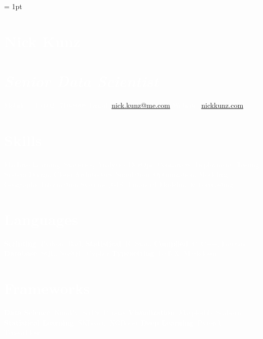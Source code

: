 \documentclass{article}
\author{Nick Kunz}
\begin{document}
\noindent
\scriptsize
{}\font = 1pt
    \begin{bgbox}[
        height = \paperheight,
        width = 0.3\textwidth,
        colback = gray
    ]
        \textcolor{white}{
            \section*{Nick Kunz}
            \section*{\textit{\normalsize{Senior Data Scientist}}}
                Mobile: \space\space\space\space\space\space+1 $($602$)$ 710-8608\newline
                Email: \space\space\space\space\space\space\space\space\space\url{nick.kunz@me.com}\newline
                Website: \space\space\space\space\space\url{nickkunz.com}
            \section*{Skills}
                Machine Learning, Statistics, Analytics\newline
                DevOps, Containers, Deployment, Testing\newline
                System Design, Cloud Architecture\newline
                Simulation, Optimization, Modeling\newline
                Geographic Information Systems (GIS)\newline
                Financial Modeling \& Forecasting
            \section*{Languages}
                \textbf{Scripting}: Python, Bash\newline
                \textbf{Statistical}: R, Stata\newline
                \textbf{Compiled}: C/C++, Fortran\newline
                \textbf{Database}: SQL, NoSQL, Cypher\newline
                \textbf{Typesetting}: \LaTeX, Markdown
            \section*{Frameworks}
                \textbf{Data Science}: NumPy, SciPy, Pandas\newline
                \textbf{Visualization}: Matplotlib, Seaborn\newline
                \textbf{Statistical Learning}: SKLearn, XGBoost\newline
                \textbf{Deep Learning}: Pytorch, TensorFlow
}
\end{bgbox}
\end{document}
